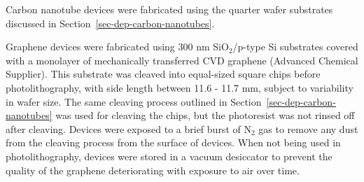\documentclass[
  a4paper,
]{scrbook}
\begin{document}
Carbon nanotube devices were fabricated using the quarter wafer
substrates discussed in Section~\ref{sec-dep-carbon-nanotubes}.

Graphene devices were fabricated using 300 nm SiO\(_2\)/p-type Si
substrates covered with a monolayer of mechanically transferred CVD
graphene (Advanced Chemical Supplier). This substrate was cleaved into
equal-sized square chips before photolithography, with side length
between 11.6 - 11.7 mm, subject to variability in wafer size. The same
cleaving process outlined in Section~\ref{sec-dep-carbon-nanotubes} was
used for cleaving the chips, but the photoresist was not rinsed off
after cleaving. Devices were exposed to a brief burst of N\(_2\) gas to
remove any dust from the cleaving process from the surface of devices.
When not being used in photolithography, devices were stored in a vacuum
desiccator to prevent the quality of the graphene deteriorating with
exposure to air over time.
\end{document}
